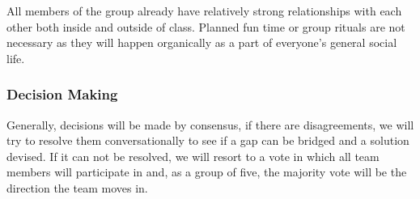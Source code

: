 \documentclass{article}
\begin{document}
\par{All members of the group already have relatively strong relationships with each other both inside and outside of class. Planned fun time or group rituals are
not necessary as they will happen organically as a part of everyone's general social life.}

\subsubsection*{Decision Making} 


\par{Generally, decisions will be made by consensus, if there are
disagreements, we will try to resolve them conversationally to see if a gap can be bridged and a solution devised. If it can not be resolved, we will
resort to a vote in which all team members will participate in and, as a group of five, the majority vote will be the direction the team moves in. }
\end{document}
